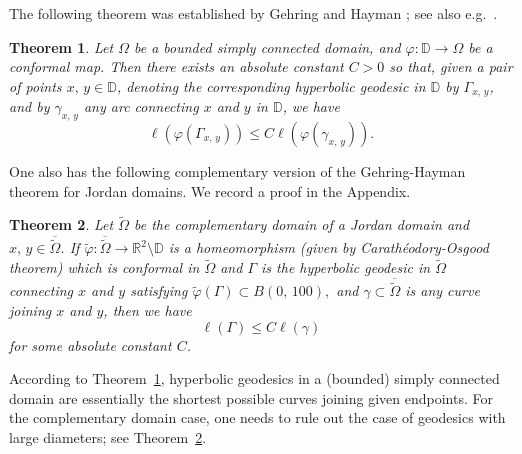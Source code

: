 \documentclass[reqno,11pt]{amsart}
\makeatletter
\def\dist{{\mathop\mathrm{\,dist\,}}}
\def\wz{\widetilde}
\newtheorem{thm}{Theorem}[section]
\newtheorem{lem}[thm]{Lemma}%
\numberwithin{equation}{section}
\theoremstyle{remark}
\makeatother
\begin{document}
The following theorem was established by  Gehring and Hayman \cite{GH1962}; see also  e.g.\ {\cite[Theorem 4.20, Page 88]{P1992}}. 
\begin{thm}\label{GM bdd}
Let $\Omega$ be a bounded simply connected domain, and $\varphi\colon \mathbb D \to \Omega$ be a conformal map. Then there exists an absolute constant $C>0$ so that,  given a pair of points
$x,\,y\in \mathbb D$, 
denoting the corresponding hyperbolic geodesic in 
$\mathbb D$ by $\Gamma_{x,\,y}$, 
and by $\gamma_{x,\,y}$ any 
arc connecting $x$ and $y$ in $ \mathbb D$, we have
$$\ell(\varphi(\Gamma_{x,\,y}))\le C \ell(\varphi(\gamma_{x,\,y})). $$
\end{thm}

One also has the following complementary version of the Gehring-Hayman theorem for Jordan domains. We record a proof in the Appendix. 
 
\begin{thm}\label{GM unbounded}
Let $\wz \Omega$ be the complementary domain of a Jordan domain and $x,\,y\in \overline{\wz \Omega}$. 
If $\wz \varphi\colon  \overline{\wz \Omega}  \to \mathbb R^2\setminus  {\mathbb  D}$ is a homeomorphism  (given by Carath\'eodory-Osgood  theorem) which is conformal in $\wz\Omega$ and $\Gamma$ is the hyperbolic
geodesic in $\wz \Omega $ connecting $x$ and $y$ satisfying 
$ \wz \varphi (\Gamma) \subset B(0,\,100),$ and $\gamma\subset \overline{ \wz \Omega}$ is any curve joining $x$ and $y$, then we have
$$\ell( \Gamma  )\le C \ell( \gamma ) $$
for some absolute constant $C$. 
\end{thm}
 

According to Theorem~\ref{GM bdd}, hyperbolic geodesics in a (bounded) simply
connected domain are essentially the shortest possible curves joining given
endpoints. For the complementary domain case, one needs to rule out the case of
geodesics with large diameters; see Theorem~\ref{GM unbounded}.
\end{document}
